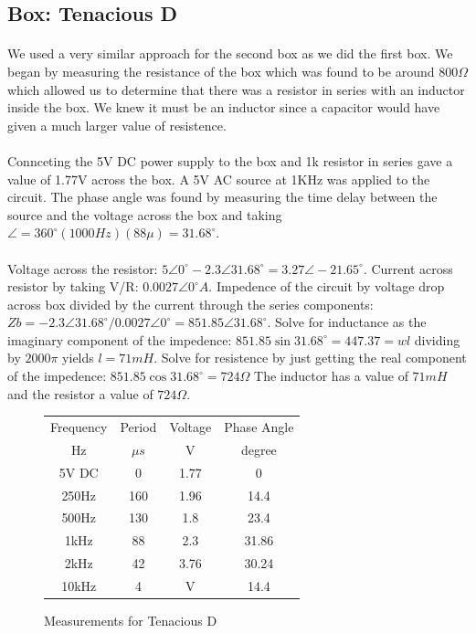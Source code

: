 \documentclass{article}
\begin{document}
\subsection*{Box: Tenacious D}
\paragraph{}
We used a very similar approach for the second box as we did the first box. We
began by measuring the resistance of the box which was found to be around
$800\Omega$ which allowed us to determine that there was a resistor in series
with an inductor inside the box. 
We knew it must be an inductor since a capacitor 
would have given a much larger value of resistence. 
\paragraph{}
Connceting the 5V DC power supply to the box and 1k resistor in series gave a 
value of 1.77V across the box. A 5V AC source at 1KHz was applied to the circuit.
The phase angle was found by measuring the time delay between the source and 
the voltage across the box and taking $\angle{} = 360^\circ{}(1000Hz)(88\mu{}) = 31.68^\circ{}$.
\paragraph{}
Voltage across the resistor: $5\angle{}0^\circ{} - 2.3\angle{}31.68^\circ{} = 3.27\angle{}-21.65^\circ{}$.
Current across resistor by taking V/R: $0.0027\angle{}0^\circ{}A$.
Impedence of the circuit by voltage drop across box divided by the current through the series components: 
$Zb= -2.3\angle{}31.68^\circ{} / 0.0027\angle{}0^\circ{} = 851.85\angle{}31.68^\circ{}$.
Solve for inductance as the imaginary component of the impedence: $851.85\sin{}31.68^\circ{} = 447.37 = wl$ 
dividing by $2000\pi{}$ yields $l=71mH$.
Solve for resistence by just getting the real component of the impedence: 
$851.85\cos{}31.68^\circ{} = 724\Omega$
The inductor has a value of $71mH$ and the resistor a value of $724\Omega$.


\begin{figure}[!h]
\caption{Measurements for Tenacious D}
\begin{center}
\begin{tabular}{|c|c|c|c|}
\hline
Frequency & Period & Voltage & Phase Angle\\
Hz & $\mu{}s$ & V & degree\\
\hline
5V DC & 0 & 1.77 & 0\\
\hline
250Hz & 160 & 1.96 & 14.4\\
\hline
500Hz & 130 & 1.8 & 23.4\\
\hline
1kHz & 88 & 2.3 & 31.86\\
\hline
2kHz & 42 & 3.76 & 30.24\\
\hline
10kHz & 4 & V & 14.4\\
\hline
\end{tabular}
\end{center}
\end{figure}
\end{document}
